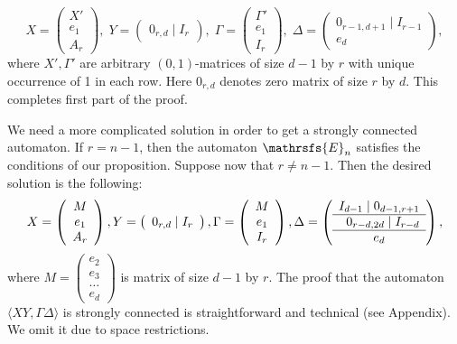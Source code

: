 \documentclass[11pt]{llncs}
\newcommand{\G}{\Gamma}
\newcommand{\D}{\Delta}
\begin{document}
$$
X =
\left(
\begin{array}{c}
X' \\
e_1 \\
A_r
\end{array}
\right),\;
Y =
\left(
\begin{array}{c}
0_{r,d} \mid I_r
\end{array}
\right),\;
\G =
\left(
\begin{array}{c}
\G' \\
e_1 \\
I_r
\end{array}
\right),\;
\D =
\left(
\begin{array}{c}
0_{r-1,d + 1} \mid I_{r-1}\\ \hline
e_d
\end{array}
\right),
$$
where $X', \G'$ are arbitrary $(0,1)$-matrices of size $d-1$ by $r$ with unique occurrence of 1
in each row. Here $0_{r,d}$ denotes zero matrix of size $r$ by $d$. This completes first part of the proof.

We need a more complicated solution in order to get a strongly connected automaton. If $r = n - 1$, then the automaton $\mathrsfs{E}_n$
satisfies the conditions of our proposition. Suppose now that $r \neq n - 1$. Then the desired solution is the following:
$$
X =
\left(
\begin{array}{c}
M \\
e_1 \\
A_r
\end{array}
\right),
Y =
\left(
\begin{array}{c}
0_{r,d} \mid I_r
\end{array}
\right),
\G =
\left(
\begin{array}{c}
M \\
e_1 \\
I_r
\end{array}
\right),
\D =
\left(
\begin{array}{c}
I_{d - 1} \mid 0_{d-1,r + 1} \\ \hline
\textbf{\,\,\,} 0_{r-d,2d} \mid I_{r - d} \\ \hline
e_d
\end{array}
\right),
$$
where $M =
\left(
\begin{smallmatrix}
e_2\\
e_3\\
\ldots\\
e_d
\end{smallmatrix}\right)$ is matrix of size $d - 1$ by $r$.
The proof that the automaton $\langle XY, \G\D\rangle$ is strongly connected is straightforward and technical (see Appendix). We omit it
due to space restrictions.
\end{document}
